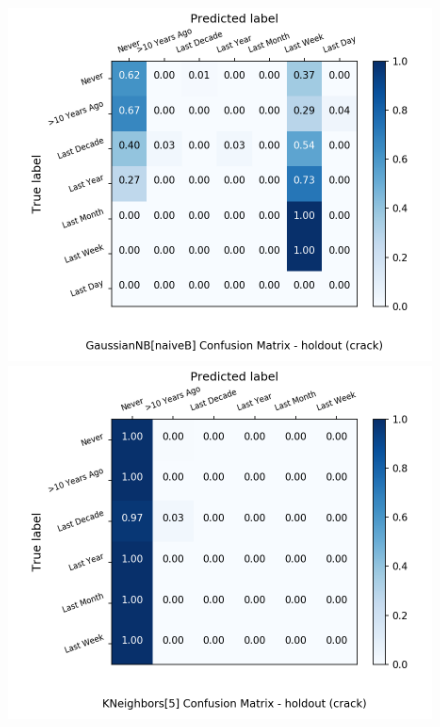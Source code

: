 \begin{figure}[H]
\begin{minipage}[b]{0.32\textwidth}
		\includegraphics[width=1.1\textwidth]{Plots/drugs/crack_GaussianNB_naiveB_balance_False_holdout.png}
	\end{minipage}
	\begin{minipage}[b]{0.32\textwidth}
		\includegraphics[width=1.1\textwidth]{Plots/drugs/crack_KNeighbors_5_balance_False_holdout.png}
  \end{minipage}
	\begin{minipage}[b]{0.32\textwidth}

\end{minipage}
\end{figure}
